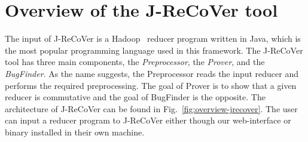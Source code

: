 \documentclass{llncs}
\begin{document}
\section{Overview of the J-ReCoVer tool}
\label{sec:overview}
The input of J-ReCoVer is a Hadoop~\cite{hadoop} reducer program written in Java, which is the most popular programming language used in this framework. 
The J-ReCoVer tool has three main components, the \emph{Preprocessor}, the \emph{Prover}, and the \emph{BugFinder}. As the name suggests, the Preprocessor reads the input reducer and performs the required preprocessing.  The goal of Prover is to show that a given reducer is commutative and the goal of BugFinder is the opposite. The architecture of J-ReCoVer can be found in Fig.~\ref{fig:overview-jrecover}. The user can input a reducer program to J-ReCoVer either though our web-interface or binary installed in their own machine. 
\end{document}
